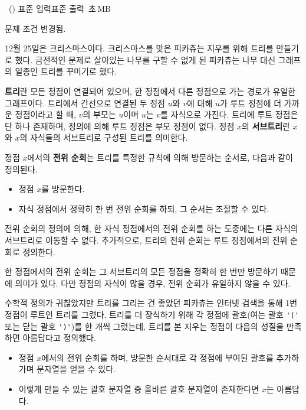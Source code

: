\begin{problem}{\kcpcprobpretty\ (\kcpcprobprettyshort)}
    {표준 입력}{표준 출력}
    {\kcpcprobprettytime\,초}{\kcpcprobprettymemory\,MB}{}
    
     {\color{red} 문제 조건 변경됨.}
     
    12월 25일은 크리스마스이다. 크리스마스를 맞은 피카츄는 지우를 위해 트리를 만들기로 했다. 금전적인 문제로 살아있는 나무를 구할 수 없게 된 피카츄는 나무 대신 그래프의 일종인 트리를 꾸미기로 했다.
    
    \textbf{트리}란 모든 정점이 연결되어 있으며, 한 정점에서 다른 정점으로 가는 경로가 유일한 그래프이다. 트리에서 간선으로 연결된 두 정점 $u$와 $v$에 대해 $u$가 루트 정점에 더 가까운 정점이라고 할 때, $v$의 부모는 $u$이며 $u$는 $v$를 자식으로 가진다. 트리에 루트 정점은 단 하나 존재하며, 정의에 의해 루트 정점은 부모 정점이 없다. 정점 $x$의 \textbf{서브트리}란 $x$와 $x$의 자식들의 서브트리로 구성된 트리를 의미한다.
    
    정점 $x$에서의 \textbf{전위 순회}는 트리를 특정한 규칙에 의해 방문하는 순서로, 다음과 같이 정의된다.
    
    \begin{itemize}
        \item 정점 $x$를 방문한다.
        \item 자식 정점에서 정확히 한 번 전위 순회를 하되, 그 순서는 조절할 수 있다.
    \end{itemize}
    전위 순회의 정의에 의해, 한 자식 정점에서의 전위 순회를 하는 도중에는 다른 자식의 서브트리로 이동할 수 없다. 추가적으로, 트리의 전위 순회는 루트 정점에서의 전위 순회로 정의한다.
    
    한 정점에서의 전위 순회는 그 서브트리의 모든 정점을 정확히 한 번만 방문하기 때문에 의미가 있다. 다만 정점의 자식이 많을 경우, 전위 순회가 유일하지 않을 수 있다.
    
    수학적 정의가 귀찮았지만 트리를 그리는 건 좋았던 피카츄는 인터넷 검색을 통해 1번 정점이 루트인 트리를 그렸다. 트리를 더 장식하기 위해 각 정점에 괄호(여는 괄호 \verb|'('| 또는 닫는 괄호 \verb|')'|)를 한 개씩 그렸는데, 트리를 본 지우는 정점이 다음의 성질을 만족하면 아름답다고 정의했다.
    
    \begin{itemize}
        \item 정점 $x$에서의 전위 순회를 하며, 방문한 순서대로 각 정점에 부여된 괄호를 추가하가며 문자열을 얻을 수 있다.
        \item 이렇게 만들 수 있는 괄호 문자열 중 올바른 괄호 문자열이 존재한다면 $ x $는 아름답다.    
    \end{itemize}
    

\end{problem}
